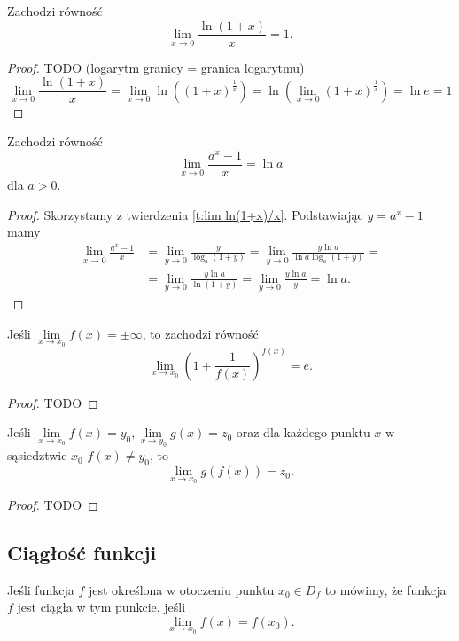 \begin{theorem}
    \label{t:lim ln(1+x)/x}
    Zachodzi równość
    \[ \lim_{x\to 0}\frac{\ln(1 + x)}{x} = 1. \]
\end{theorem}
\begin{proof}
    TODO (logarytm granicy = granica logarytmu)
    \[ \lim_{x\to 0}\frac{\ln(1 + x)}{x} = \lim_{x\to 0} \ln((1 + x)^{\frac{1}{x}}) = \ln\left(\lim_{x\to 0} (1 + x)^{\frac{1}{x}}\right) = \ln e = 1 \]
\end{proof}

\begin{theorem}
    Zachodzi równość
    \[ \lim_{x\to 0}\frac{a^x - 1}{x} = \ln a \]
    dla $a > 0$.
\end{theorem}
\begin{proof}
    Skorzystamy z twierdzenia \ref{t:lim ln(1+x)/x}. Podstawiając $y = a^x - 1$ mamy
    \begin{align*} \lim_{x\to 0}\frac{a^x - 1}{x} &= \lim_{y\to 0}\frac{y}{\log_a(1 + y)} = \lim_{y\to 0}\frac{y\ln{a}}{\ln {a}\log_a(1 + y)} = \\
    &= \lim_{y\to 0}\frac{y\ln{a}}{\ln(1 + y)} = \lim_{y\to 0}\frac{y\ln{a}}{y} = \ln{a}. \end{align*}
\end{proof}

\begin{theorem}
    Jeśli $\lim\limits_{x\to x_0} f(x) = \pm\infty$, to zachodzi równość
    \[ \lim_{x\to x_0}\left(1 + \frac{1}{f(x)}\right)^{f(x)} = e. \]
\end{theorem}
\begin{proof}
    TODO
\end{proof}

\begin{theorem}
    Jeśli $\lim\limits_{x\to x_0} f(x) = y_0, \lim\limits_{x\to y_0} g(x) = z_0$ oraz dla każdego punktu $x$ w sąsiedztwie $x_0$ $f(x) \neq y_0$, to
    \[ \lim_{x\to x_0} g(f(x)) = z_0. \]
\end{theorem}
\begin{proof}
    TODO
\end{proof}

\subsection{Ciągłość funkcji}
\begin{definition}
    Jeśli funkcja $f$ jest określona w otoczeniu punktu $x_0 \in D_f$ to mówimy, że funkcja $f$ jest ciągła w tym punkcie, jeśli
    \[ \lim_{x \to x_0} f(x) = f(x_0). \]
\end{definition}

